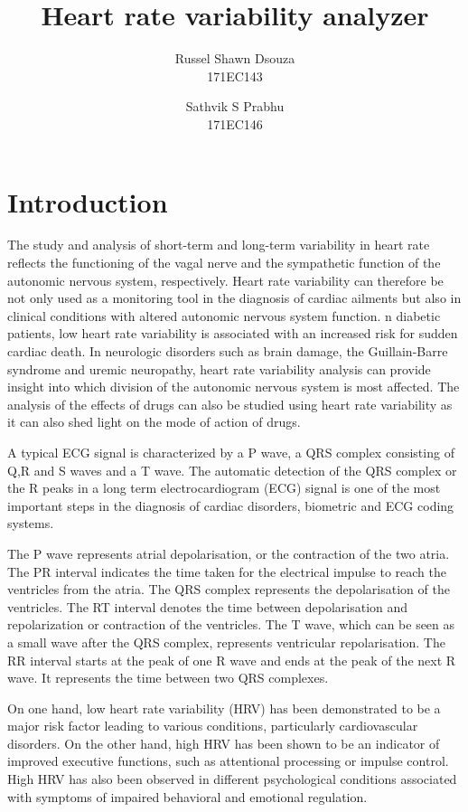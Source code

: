 \documentclass[11pt]{article}
\title{\textbf{Heart rate variability analyzer}}
\author{
  Russel Shawn Dsouza\\
  171EC143
  \and
  Sathvik S Prabhu\\
  171EC146
}
\date{}
\theoremstyle{definition}
\begin{document}
  \maketitle

  \newpage
  \tableofcontents

  \newpage
  \section{Introduction}
  The study and analysis of short-term and long-term variability in heart rate reflects the functioning of the vagal nerve and the sympathetic function of the autonomic nervous system, respectively.
  Heart rate variability can therefore be not only used as a monitoring tool in the diagnosis of cardiac ailments but also in clinical conditions with altered autonomic nervous system function.
  n diabetic patients, low heart rate variability is associated with an increased risk for sudden cardiac death.
  In neurologic disorders such as brain damage, the Guillain-Barre syndrome and uremic neuropathy, heart rate variability analysis can provide insight into which division of the autonomic nervous system is most affected.
  The analysis of the effects of drugs can also be studied using heart rate variability as it can also shed light on the mode of action of drugs.

  A typical ECG signal is characterized by a P wave, a QRS complex consisting of Q,R and S waves and a T wave.
  The automatic detection of the QRS complex or the R peaks in a long term electrocardiogram (ECG) signal is one of the most important steps in the diagnosis of cardiac disorders, biometric and ECG coding systems.

  The P wave represents atrial depolarisation, or the contraction of the two atria.
  The PR interval indicates the time taken for the electrical impulse to reach the ventricles from the atria.
  The QRS complex represents the depolarisation of the ventricles.
  The RT interval denotes the time between depolarisation and repolarization or contraction of the ventricles.
  The T wave, which can be seen as a small wave after the QRS complex, represents ventricular repolarisation.
  The RR interval starts at the peak of one R wave and ends at the peak of the next R wave. It represents the time between two QRS complexes.

  On one hand, low heart rate variability (HRV) has been demonstrated to be a major risk factor leading to various conditions, particularly cardiovascular disorders\cite{kamath1987heart}.
  On the other hand, high HRV has been shown to be an indicator of improved executive functions, such as attentional processing or impulse control\cite{appelhans2006heart, thayer2005psychosomatics}.
  High HRV has also been observed in different psychological conditions associated with symptoms of impaired behavioral and emotional regulation\cite{thayer2009claude, schulz2008negative}.
\end{document}
